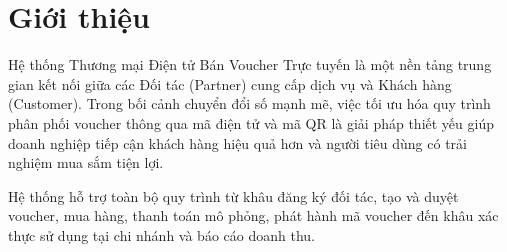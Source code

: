 \section{Giới thiệu}
Hệ thống Thương mại Điện tử Bán Voucher Trực tuyến là một nền tảng trung gian kết nối giữa các Đối tác (Partner) cung cấp dịch vụ và Khách hàng (Customer). Trong bối cảnh chuyển đổi số mạnh mẽ, việc tối ưu hóa quy trình phân phối voucher thông qua mã điện tử và mã QR là giải pháp thiết yếu giúp doanh nghiệp tiếp cận khách hàng hiệu quả hơn và người tiêu dùng có trải nghiệm mua sắm tiện lợi.

Hệ thống hỗ trợ toàn bộ quy trình từ khâu đăng ký đối tác, tạo và duyệt voucher, mua hàng, thanh toán mô phỏng, phát hành mã voucher đến khâu xác thực sử dụng tại chi nhánh và báo cáo doanh thu.
